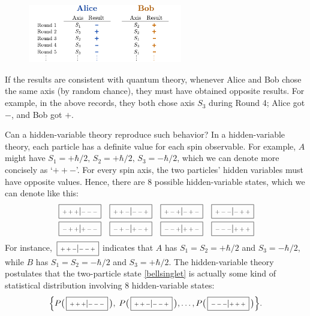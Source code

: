 \documentclass[pra,12pt]{revtex4-2}
\def\hvbox[#1]#2{\,\boxed{\scalebox{0.7}{$\,#1$}|\scalebox{0.7}{$#2\,$}}}
\begin{document}
\begin{figure}[h]
  \centering\includegraphics[width=0.6\textwidth]{bell}
\end{figure}

\noindent
If the results are consistent with quantum theory, whenever Alice and
Bob chose the same axis (by random chance), they must have obtained
opposite results.  For example, in the above records, they both chose
axis $S_3$ during Round 4; Alice got $-$, and Bob got $+$.

Can a hidden-variable theory reproduce such behavior?  In a
hidden-variable theory, each particle has a definite value for each
spin observable.  For example, $A$ might have $S_1 = +\hbar/2, \, S_2
= +\hbar/2, \, S_3 = -\hbar/2$, which we can denote more concisely as
`$++-$'.  For every spin axis, the two particles' hidden variables
must have opposite values.  Hence, there are $8$ possible
hidden-variable states, which we can denote like this:
\begin{align*}
  \begin{aligned}
    \hvbox[+++]{---} \;\;\;
    \hvbox[++-]{--+} \;\;\;
    \hvbox[+-+]{-+-} \;\;\;
    \hvbox[+--]{-++}\\
    \hvbox[-++]{+--} \;\;\;
    \hvbox[-+-]{+-+} \;\;\;
    \hvbox[--+]{++-} \;\;\;
    \hvbox[---]{+++}
  \end{aligned}
\end{align*}
For instance, $\hvbox[++-]{--+}$ indicates that $A$ has $S_1 = S_2 =
+\hbar/2$ and $S_3 = -\hbar/2$, while $B$ has $S_1 = S_2 = -\hbar/2$
and $S_3 = +\hbar/2$.  The hidden-variable theory postulates that the
two-particle state \eqref{bellsinglet} is actually some kind of
statistical distribution involving 8 hidden-variable states:
\begin{equation*}
  \Big\{ P\big(\hvbox[+++]{---}\,\big), \;P\big(\hvbox[++-]{--+}\,\big),
  \dots, P\big(\hvbox[---]{+++}\,\big) \Big\}.
\end{equation*}
\end{document}
